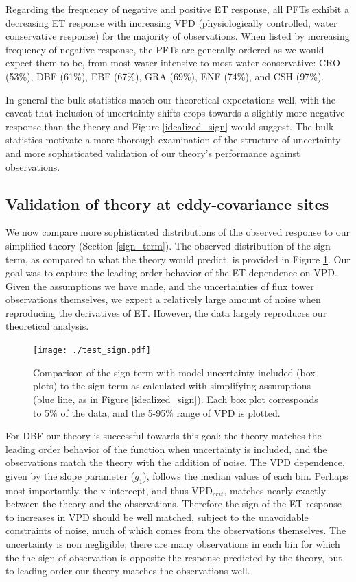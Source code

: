 \documentclass[draft,linenumbers]{agujournal}
\begin{document}
Regarding the frequency of negative and positive ET response, all PFTs
exhibit a decreasing ET response with increasing VPD (physiologically
controlled, water conservative response) for the majority of
observations. When listed by increasing frequency of negative
response, the PFTs are generally ordered as we would expect them to
be, from most water intensive to most water conservative: CRO (53\%),
DBF (61\%), EBF (67\%), GRA (69\%), ENF (74\%), and CSH (97\%).

In general the bulk statistics match our theoretical expectations
well, with the caveat that inclusion of uncertainty shifts crops
towards a slightly more negative response than the theory and Figure
\ref{idealized_sign} would suggest. The bulk statistics motivate a
more thorough examination of the structure of uncertainty and more
sophisticated validation of our theory's performance against
observations.

\subsection{Validation of theory at eddy-covariance sites}
\label{testing} We now compare more sophisticated distributions of the
observed response to our simplified theory (Section
\ref{sign_term}). The observed distribution of the sign term, as
compared to what the theory would predict, is provided in Figure
\ref{test_sign}. Our goal was to capture the leading order behavior of
the ET dependence on VPD. Given the assumptions we have made, and the
uncertainties of flux tower observations themselves, we expect a
relatively large amount of noise when reproducing the derivatives of
ET. However, the data largely reproduces our theoretical analysis.

\begin{figure} \centering
\texttt{[image: ./test\_sign.pdf]}
\caption{Comparison of the sign term with model uncertainty included
(box plots) to the sign term as calculated with simplifying
assumptions (blue line, as in Figure \ref{idealized_sign}). Each box
plot corresponds to 5\% of the data, and the 5-95\% range of VPD is
plotted.}
\label{test_sign}
\end{figure}

For DBF our theory is successful towards this goal: the theory matches
the leading order behavior of the function when uncertainty is
included, and the observations match the theory with the addition of
noise. The VPD dependence, given by the slope parameter ($g_1$),
follows the median values of each bin. Perhaps most importantly, the
x-intercept, and thus VPD$_{crit}$, matches nearly exactly between the
theory and the observations. Therefore the sign of the ET response to
increases in VPD should be well matched, subject to the unavoidable
constraints of noise, much of which comes from the observations
themselves. The uncertainty is non negligible; there are many
observations in each bin for which the the sign of observation is
opposite the response predicted by the theory, but to leading order
our theory matches the observations well.
\end{document}
